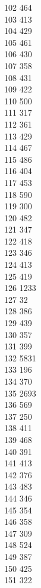 { 102	464 \\
 103	413 \\
 104	429 \\
 105	461 \\
 106	430 \\
 107	358 \\
 108	431 \\
 109	422 \\
 110	500 \\
 111	317 \\
 112	361 \\
 113	429 \\
 114	467 \\
 115	486 \\
 116	404 \\
 117	453 \\
 118	590 \\
 119	300 \\
 120	482 \\
 121	347 \\
 122	418 \\
 123	346 \\
 124	413 \\
 125	419 \\
 126	1233 \\
 127	32 \\
 128	386 \\
 129	439 \\
 130	357 \\
 131	399 \\
 132	5831 \\
 133	196 \\
 134	370 \\
 135	2693 \\
 136	569 \\
 137	250 \\
 138	411 \\
 139	468 \\
 140	391 \\
 141	413 \\
 142	376 \\
 143	483 \\
 144	346 \\
 145	354 \\
 146	358 \\
 147	309 \\
 148	524 \\
 149	387 \\
 150	425 \\
 151	322 \\
}
